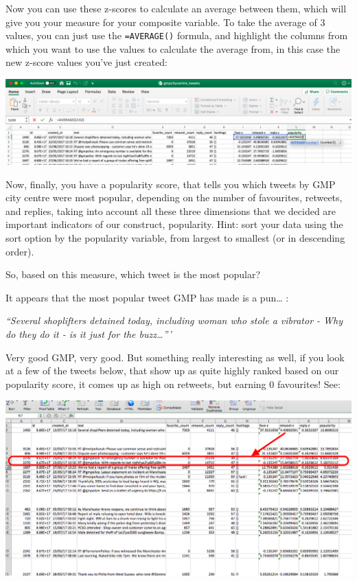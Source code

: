 \documentclass[
]{book}
\begin{document}
Now you can use these z-scores to calculate an average between them, which will give you your measure for your composite variable. To take the average of 3 values, you can just use the \texttt{=AVERAGE()} formula, and highlight the columns from which you want to use the values to calculate the average from, in this case the new z-score values you've just created:

\includegraphics{imgs/calc_popul.png}

Now, finally, you have a popularity score, that tells you which tweets by GMP city centre were most popular, depending on the number of favourites, retweets, and replies, taking into account all these three dimensions that we decided are important indicators of our construct, popularity. Hint: sort your data using the sort option by the popularity variable, from largest to smallest (or in descending order).

So, based on this measure, which tweet is the most popular?

It appears that the most popular tweet GMP has made is a pun\ldots{} :

\emph{``Several shoplifters detained today, including woman who stole a vibrator - Why do they do it - is it just for the buzz\ldots'''}

Very good GMP, very good. But something really interesting as well, if you look at a few of the tweets below, that show up as quite highly ranked based on our popularity score, it comes up as high on retweets, but earning 0 favourites! See:

\includegraphics{imgs/low_fave_high_rt.png}
\end{document}
